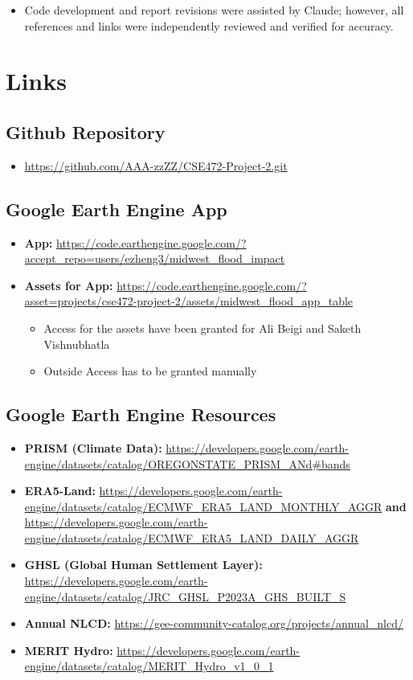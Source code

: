 \documentclass[10pt,twocolumn]{article}
\begin{document}
\begin{itemize}
    \item Code development and report revisions were assisted by Claude; however, all references and links were independently reviewed and verified for accuracy.
\end{itemize}


\section{Links}

\subsection*{Github Repository}
\begin{itemize}
    \item \url{https://github.com/AAA-zzZZ/CSE472-Project-2.git}
\end{itemize}

\subsection*{Google Earth Engine App}
\begin{itemize}
    \item \textbf{App: }
    \url{ https://code.earthengine.google.com/?accept_repo=users/ezheng3/midwest_flood_impact}
    \item \textbf{Assets for App: }\url{https://code.earthengine.google.com/?asset=projects/cse472-project-2/assets/midwest_flood_app_table}
    \begin{itemize}
    \item Access for the assets have been granted for Ali Beigi and Saketh Vishnubhatla
    \item Outside Access has to be granted manually
    \end{itemize}
\end{itemize}
\subsection*{Google Earth Engine Resources}

\begin{itemize}
    \item \textbf{PRISM (Climate Data): } \url{https://developers.google.com/earth-engine/datasets/catalog/OREGONSTATE_PRISM_ANd#bands}
    \item \textbf{ERA5-Land: }
    \url{https://developers.google.com/earth-engine/datasets/catalog/ECMWF_ERA5_LAND_MONTHLY_AGGR}\textbf{ and  }\url{https://developers.google.com/earth-engine/datasets/catalog/ECMWF_ERA5_LAND_DAILY_AGGR}
    \item \textbf{GHSL (Global Human Settlement Layer): } \url{https://developers.google.com/earth-engine/datasets/catalog/JRC_GHSL_P2023A_GHS_BUILT_S}
    \item \textbf{Annual NLCD: }\url{https://gee-community-catalog.org/projects/annual_nlcd/}
    \item \textbf{MERIT Hydro: }\url{https://developers.google.com/earth-engine/datasets/catalog/MERIT_Hydro_v1_0_1}
\end{itemize}
\end{document}
